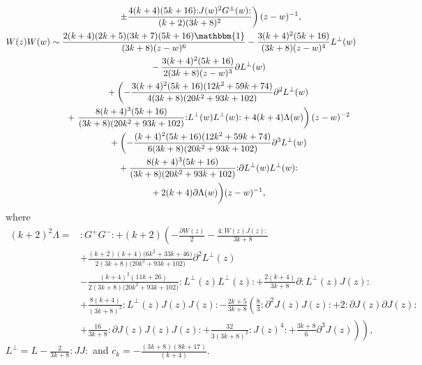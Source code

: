 \documentclass[11pt]{article}
\numberwithin{equation}{section}
\begin{document}
\begin{gather*}
	 \phantom{ W(z)G^{\pm}(w) \sim }{} \left. \pm \frac{4(k+4)(5k+16){:}J(w)^2G^{\pm}(w){:}}{(k+2)(3k+8)^2} \right)(z-w)^{-1} , \\
	 W(z)W(w) \sim \frac{2(k+4)(2k+5)(3k+7)(5k+16)\mathbbm{1}}{(3k+8)(z-w)^{6}} -\frac{3(k + 4)^2( 5 k + 16)}{(3k+8)(z-w)^{4}}L^{\perp}(w) \\
\phantom{W(z)W(w) \sim}{}	 -\frac{3(k + 4)^2( 5 k + 16)}{2(3k+8)(z-w)^{3}}\partial L^{\perp}(w) \\
\phantom{W(z)W(w) \sim}{}+\left( -\frac{3(k + 4)^2( 5 k + 16)(12k^2 + 59k + 74)}{4(3k+8)(20k^2 + 93k + 102)}\partial^2L ^{\perp}(w)\right. \\
\phantom{W(z)W(w) \sim}{}	 + \left. \frac{8(k + 4)^3( 5 k + 16)}{(3k+8)(20k^2 + 93k + 102)}{:}L^{\perp}(w)L^{\perp}(w){:} + 4 (k+4) \Lambda (w)\right) (z-w)^{-2} \\
\phantom{W(z)W(w) \sim}{}	 + \biggl( -\frac{(k + 4)^2( 5 k + 16)(12k^2 + 59k + 74)}{6(3k+8)(20k^2 + 93k + 102)}\partial ^3L^{\perp}(w) \\
\phantom{W(z)W(w) \sim}{}	 +   \frac{8(k + 4)^3( 5 k + 16)}{(3k+8)(20k^2 + 93k + 102)}{:}\partial L^{\perp}(w)L^{\perp}(w){:} \\
\phantom{W(z)W(w) \sim}{}  + 2 (k+4) \partial \Lambda(w)\biggr)(z-w)^{-1},
\end{gather*}
 where
 \begin{align*}
 	(k+2)^2\Lambda = {}&{:} G^+ G^-{:} + (k+2) \left(-\frac{\partial W(z)}{2} -\frac{4 {:}W(z)J(z){:}}{3k+8}\right. \\
 &\left.+ \frac{(k+2)(k+4)\bigl(6k^2+33k+46\bigr)}{2(3k+8)\bigl(20k^2+93k+102\bigr)}\partial^2L^{\perp}(z)\right. \\
 	 &- \left. \frac{(k+4)^2(11k+26)}{2(3k+8)\bigl(20k^2+93k+102\bigr)}{:}L^{\perp}(z)L^{\perp}(z){:} + \frac{2(k+4)}{3k+8}\partial {:}L^{\perp}(z)J(z){:} \right.\\
 	 &+ \left. \frac{8(k+4)}{(3k+8)^2}{:}L^{\perp}(z)J(z)J(z){:} - \frac{2k+5}{3k+8}\left(\frac{8}{3}{:}\partial ^2J(z)J(z){:} + 2{:}\partial J(z)\partial J(z){:}\right. \right. \\
 	 &+ \left. \left. \frac{16}{3k+8}{:}\partial J(z)J(z)J(z){:} + \frac{32}{3(3k+8)^2}{:}J(z)^4{:} + \frac{3k+8}{6}\partial ^3J(z)\right) \right),
 \end{align*}
 $L^{\perp} = L-\frac{2}{3k+8}{:}JJ{:}$ and $c_k = -\frac{(3k+8)(8k+17)}{(k+4)}$.
\end{document}
